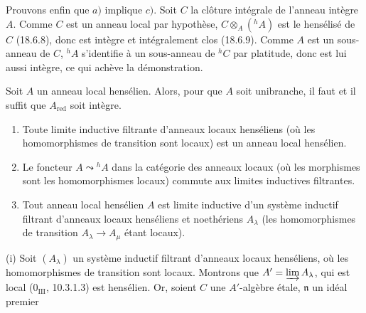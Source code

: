 Prouvons enfin que $a)$ implique $c)$. Soit $C$ la clôture intégrale de l'anneau intègre $A$. Comme $C$ est un anneau local par hypothèse, $C\otimes_A({}^h\!A)$ est le hensélisé de $C$ (18.6.8), donc est intègre et intégralement clos (18.6.9). Comme $A$ est un sous-anneau de $C$, ${}^h\!A$ s'identifie à un sous-anneau de ${}^h\!C$ par platitude, donc est lui aussi intègre, ce qui achève la démonstration.

\begin{corollary}[18.6.13]
\label{IV.18.6.13}
Soit $A$ un anneau local hensélien. Alors, pour que $A$ soit unibranche, il faut et il suffit que $A_{\mathrm{red}}$ soit intègre.
\end{corollary}

\begin{proposition}[18.6.14]
\label{IV.18.6.14}
\begin{enumerate}
  \item[(i)] Toute limite inductive filtrante d'anneaux locaux henséliens (où les homomorphismes de transition sont locaux) est un anneau local hensélien.
  \item[(ii)] Le foncteur $A\leadsto{}^h\!A$ dans la catégorie des anneaux locaux (où les morphismes sont les homomorphismes locaux) commute aux limites inductives filtrantes.
  \item[(iii)] Tout anneau local hensélien $A$ est limite inductive d'un système inductif filtrant d'anneaux locaux henséliens et noethériens $A_\lambda$ (les homomorphismes de transition $A_\lambda\to A_\mu$ étant locaux).
\end{enumerate}
\end{proposition}

(i) Soit $(A_\lambda)$ un système inductif filtrant d'anneaux locaux henséliens, où les homomorphismes de transition sont locaux. Montrons que $A'=\varinjlim A_\lambda$, qui est local ($0_{\mathrm{III}}$, 10.3.1.3) est hensélien. Or, soient $C$ une $A'$-algèbre étale, $\mathfrak n$ un idéal premier

